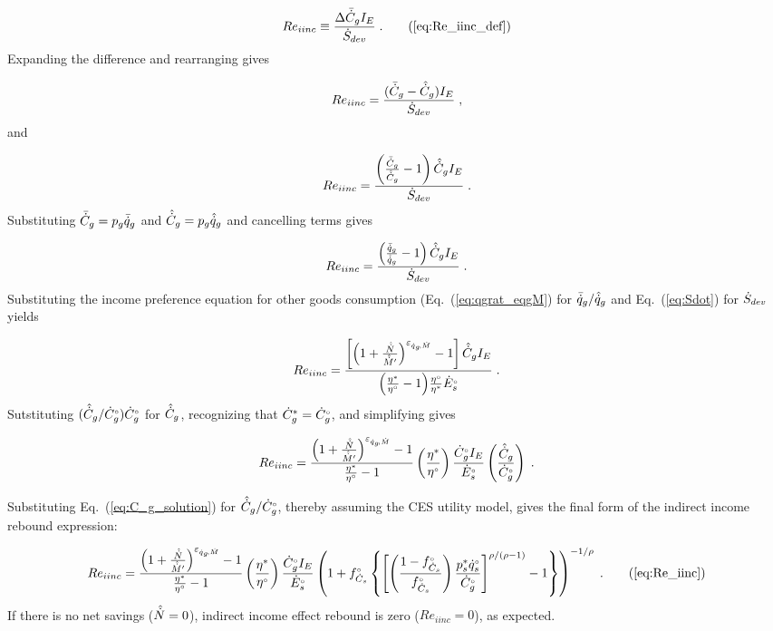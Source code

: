 \begin{equation}
  Re_{iinc} \equiv \frac{\Delta \rainc{C}_g I_E}{\Sdot} \; . \tag{\ref{eq:Re_iinc_def}}
\end{equation}
%
Expanding the difference and rearranging gives

\begin{equation}
  Re_{iinc} = \frac{(\bar{\dot{C}}_g - \hat{\dot{C}}_g) I_E}{\dot{S}_{dev}} \; ,
\end{equation}
%
and

\begin{equation}
  Re_{iinc} = \frac{\left( \frac{\bar{\dot{C}}_g}{\hat{\dot{C}}_g} - 1  \right) \hat{\dot{C}}_g I_E}{\dot{S}_{dev}} \; .
\end{equation}
%
Substituting $\bar{\dot{C}}_g = p_g \bar{\dot{q}}_g$ and $\hat{\dot{C}}_g = p_g \hat{\dot{q}}_g$ and
cancelling terms gives

\begin{equation}
  Re_{iinc} = \frac{\left( \frac{\bar{\dot{q}}_g}{\hat{\dot{q}}_g} - 1  \right) \hat{\dot{C}}_g I_E}{\dot{S}_{dev}} \; .
\end{equation}
%
Substituting the income preference equation for other goods consumption (Eq.~(\ref{eq:qgrat_eqgM})
for $\bar{\dot{q}}_g / \hat{\dot{q}}_g$
and Eq.~(\ref{eq:Sdot}) for $\dot{S}_{dev}$ yields

\begin{equation}
  Re_{iinc} = \frac{\left[ \left( 1 + \frac{\hat{\dot{N}}}{\hat{\dot{M}}^\prime} \right)^{\varepsilon_{\dot{q}_g\!,\dot{M}}} - 1  \right]
              \hat{\dot{C}}_g I_E}{\left( \frac{{\eta}^*}{{}{\eta}^{\scriptscriptstyle \circ}} - 1 \right)\! \frac{{}{\eta}^{\scriptscriptstyle \circ}}{{\eta}^*} {}{\dot{E}}^{\scriptscriptstyle \circ}_s} \; .
\end{equation}
%
Sutstituting $(\hat{\dot{C}}_g/{}{\dot{C}}^{\scriptscriptstyle \circ}_g) {}{\dot{C}}^{\scriptscriptstyle \circ}_g$ for $\hat{\dot{C}}_g$,
recognizing that ${\dot{C}}^*_g = {}{\dot{C}}^{\scriptscriptstyle \circ}_g$, and simplifying gives

\begin{equation}
  Re_{iinc} = \frac{\left( 1 + \frac{\hat{\dot{N}}}{\hat{\dot{M}}^\prime} \right)^{\varepsilon_{\dot{q}_g\!,\dot{M}}} - 1}{\frac{{\eta}^*}{{}{\eta}^{\scriptscriptstyle \circ}} - 1}
              \left( \frac{{\eta}^*}{{}{\eta}^{\scriptscriptstyle \circ}} \right)
              \frac{{}{\dot{C}}^{\scriptscriptstyle \circ}_g I_E}{{}{\dot{E}}^{\scriptscriptstyle \circ}_s}
              \left( \frac{\hat{\dot{C}}_g}{{}{\dot{C}}^{\scriptscriptstyle \circ}_g} \right) \; .
\end{equation}

Substituting Eq.~(\ref{eq:C_g_solution})
for $\hat{\dot{C}}_g / {}{\dot{C}}^{\scriptscriptstyle \circ}_g$,
thereby assuming the CES utility model,
gives the final form
of the indirect income rebound expression:

\begin{equation}
  Re_{iinc} = \Reiinceqnexact{} \; . \tag{\ref{eq:Re_iinc}}
\end{equation}
%
If there is no net savings ($\hat{\dot{N}} = 0$),
indirect income effect rebound is zero ($Re_{iinc} = 0$), as expected.


